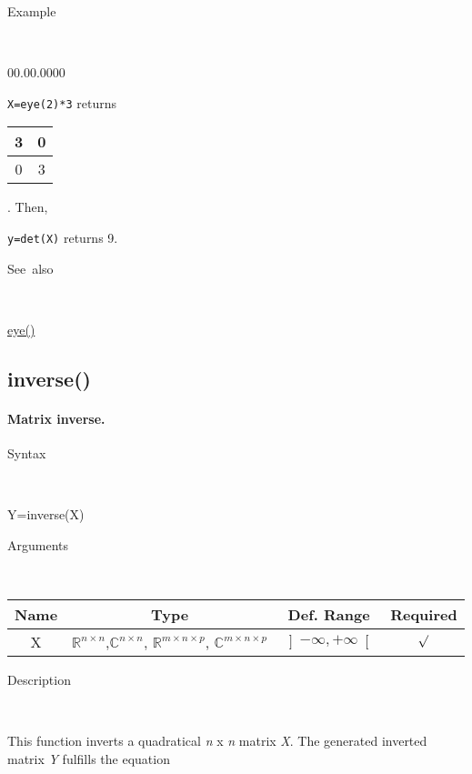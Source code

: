 \begin{description}
\item [Example]~
\end{description}
\begin{lyxlist}{00.00.0000}
\item [\texttt{X=eye(2){*}3}]returns \begin{tabular}{|c|c|}
\hline 
3&
0\tabularnewline
\hline
0&
3\tabularnewline
\hline
\end{tabular}. Then,
\item [\texttt{y=det(X)}]returns 9.
\end{lyxlist}
\begin{description}
\item [See~also]~
\end{description}
\textcolor{blue}{\hyperlink{eye}{eye()}}


\newpage
\subsection*{\hypertarget{inverse}{}{\Large inverse()}}


\paragraph{\textmd{\label{par:Matrix-inverse}}Matrix inverse.}

\begin{description}
\item [Syntax]~
\end{description}
Y=inverse(X)

\begin{description}
\item [Arguments]~
\end{description}
\begin{tabular}{|c|c|c|c|}
\hline 
Name&
Type&
Def. Range&
Required\tabularnewline
\hline
\hline 
X&
$\mathbb{\mathbb{R}}^{n\times n}$,$\mathbb{\mathbb{C}}^{n\times n}$,
$\mathbb{\mathbb{R}}^{m\times n\times p}$, $\mathbb{\mathbb{C}}^{m\times n\times p}$&
$\left]-\infty,+\infty\right[$&
$\surd$\tabularnewline
\hline
\end{tabular}

\begin{description}
\item [Description]~
\end{description}
This function inverts a quadratical \textit{n} x \textit{n} matrix
\textit{X}. The generated inverted matrix \textit{Y} fulfills the
equation

